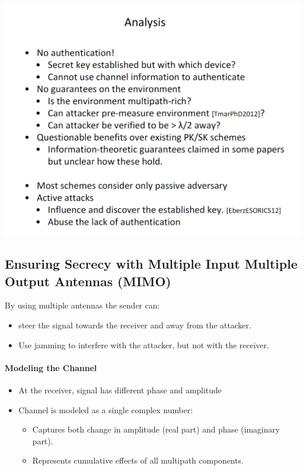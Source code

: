 \begin{minipage}{\linewidth}
    \centering      
    \includegraphics[width=\linewidth]{Figures/L7_channel_analysis.PNG} 
\end{minipage}

\subsection{Ensuring Secrecy with Multiple Input Multiple Output Antennas (MIMO)}
By using multiple antennas the sender can:
\begin{itemize}
    \item steer the signal towards the receiver and away from the attacker.
    \item Use jamming to interfere with the attacker, but not with the receiver.
\end{itemize}

\paragraph{Modeling the Channel}
\begin{itemize}
    \item At the receiver, signal has different phase and amplitude
    \item Channel is modeled as a single complex number:
    \begin{itemize}
        \item Captures both change in amplitude (real part) and phase (imaginary part).
        \item Represents cumulative effects of all multipath components.
    \end{itemize}
\end{itemize}

